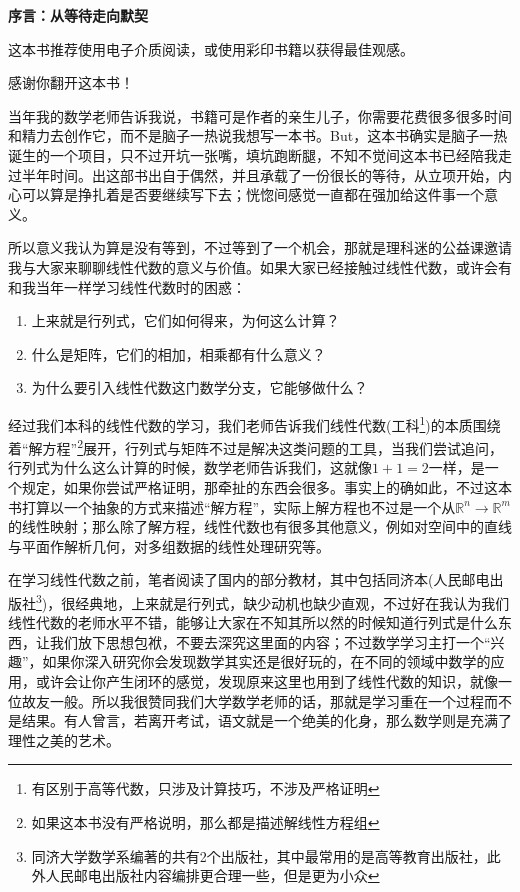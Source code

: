 
\frontmatter
\thispagestyle{empty}
\newpage
\begin{center}
	\textbf{\LARGE 序言：从等待走向默契}
\end{center}

\vspace{2em}

这本书推荐使用电子介质阅读，或使用彩印书籍以获得最佳观感。

感谢你翻开这本书！

当年我的数学老师告诉我说，书籍可是作者的亲生儿子，你需要花费很多很多时间和精力去创作它，而不是脑子一热说我想写一本书。But，这本书确实是脑子一热诞生的一个项目，只不过开坑一张嘴，填坑跑断腿，不知不觉间这本书已经陪我走过半年时间。出这部书出自于偶然，并且承载了一份很长的等待，从立项开始，内心可以算是挣扎着是否要继续写下去；恍惚间感觉一直都在强加给这件事一个意义。

所以意义我认为算是没有等到，不过等到了一个机会，那就是理科迷的公益课邀请我与大家来聊聊线性代数的意义与价值。如果大家已经接触过线性代数，或许会有和我当年一样学习线性代数时的困惑：

\vspace{1em}

\begin{enumerate}
	\item 上来就是行列式，它们如何得来，为何这么计算？
	\item 什么是矩阵，它们的相加，相乘都有什么意义？
	\item 为什么要引入线性代数这门数学分支，它能够做什么？
\end{enumerate}

\vspace{1em}

经过我们本科的线性代数的学习，我们老师告诉我们线性代数(工科\footnote{有区别于高等代数，只涉及计算技巧，不涉及严格证明})的本质围绕着``解方程''\footnote{如果这本书没有严格说明，那么都是描述解线性方程组}展开，行列式与矩阵不过是解决这类问题的工具，当我们尝试追问，行列式为什么这么计算的时候，数学老师告诉我们，这就像$1+1=2$一样，是一个规定，如果你尝试严格证明，那牵扯的东西会很多。事实上的确如此，不过这本书打算以一个抽象的方式来描述``解方程''，实际上解方程也不过是一个从$\mathbb{R}^n\rightarrow \mathbb{R}^m$的线性映射；那么除了解方程，线性代数也有很多其他意义，例如对空间中的直线与平面作解析几何，对多组数据的线性处理研究等。

在学习线性代数之前，笔者阅读了国内的部分教材，其中包括同济本(人民邮电出版社\footnote{同济大学数学系编著的共有2个出版社，其中最常用的是高等教育出版社，此外人民邮电出版社内容编排更合理一些，但是更为小众})，很经典地，上来就是行列式，缺少动机也缺少直观，不过好在我认为我们线性代数的老师水平不错，能够让大家在不知其所以然的时候知道行列式是什么东西，让我们放下思想包袱，不要去深究这里面的内容；不过数学学习主打一个``兴趣''，如果你深入研究你会发现数学其实还是很好玩的，在不同的领域中数学的应用，或许会让你产生闭环的感觉，发现原来这里也用到了线性代数的知识，就像一位故友一般。所以我很赞同我们大学数学老师的话，那就是学习重在一个过程而不是结果。有人曾言，若离开考试，语文就是一个绝美的化身，那么数学则是充满了理性之美的艺术。

